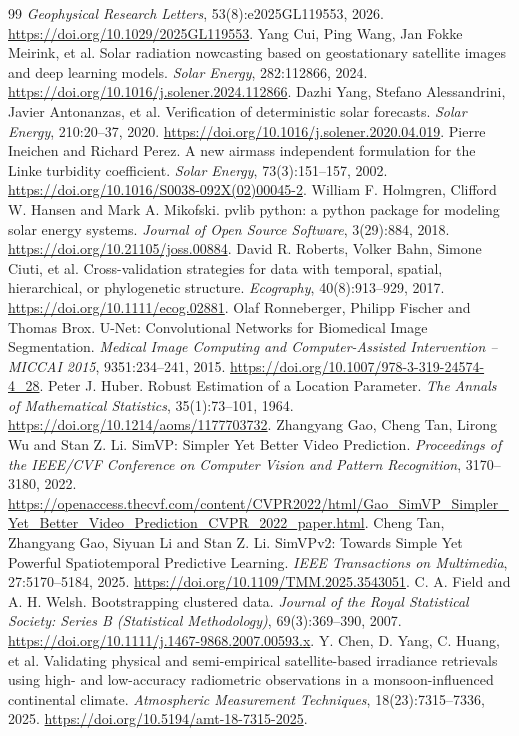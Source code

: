 \documentclass[11pt]{article}
\begin{document}
\begin{thebibliography}{99}
\textit{Geophysical Research Letters}, 53(8):e2025GL119553, 2026.
\url{https://doi.org/10.1029/2025GL119553}.
Yang Cui, Ping Wang, Jan Fokke Meirink, et al.
Solar radiation nowcasting based on geostationary satellite images and deep learning models.
\textit{Solar Energy}, 282:112866, 2024.
\url{https://doi.org/10.1016/j.solener.2024.112866}.
Dazhi Yang, Stefano Alessandrini, Javier Antonanzas, et al.
Verification of deterministic solar forecasts.
\textit{Solar Energy}, 210:20--37, 2020.
\url{https://doi.org/10.1016/j.solener.2020.04.019}.
Pierre Ineichen and Richard Perez.
A new airmass independent formulation for the Linke turbidity coefficient.
\textit{Solar Energy}, 73(3):151--157, 2002.
\url{https://doi.org/10.1016/S0038-092X(02)00045-2}.
William F. Holmgren, Clifford W. Hansen and Mark A. Mikofski.
pvlib python: a python package for modeling solar energy systems.
\textit{Journal of Open Source Software}, 3(29):884, 2018.
\url{https://doi.org/10.21105/joss.00884}.
David R. Roberts, Volker Bahn, Simone Ciuti, et al.
Cross-validation strategies for data with temporal, spatial, hierarchical, or phylogenetic structure.
\textit{Ecography}, 40(8):913--929, 2017.
\url{https://doi.org/10.1111/ecog.02881}.
Olaf Ronneberger, Philipp Fischer and Thomas Brox.
U-Net: Convolutional Networks for Biomedical Image Segmentation.
\textit{Medical Image Computing and Computer-Assisted Intervention -- MICCAI 2015}, 9351:234--241, 2015.
\url{https://doi.org/10.1007/978-3-319-24574-4_28}.
Peter J. Huber.
Robust Estimation of a Location Parameter.
\textit{The Annals of Mathematical Statistics}, 35(1):73--101, 1964.
\url{https://doi.org/10.1214/aoms/1177703732}.
Zhangyang Gao, Cheng Tan, Lirong Wu and Stan Z. Li.
SimVP: Simpler Yet Better Video Prediction.
\textit{Proceedings of the IEEE/CVF Conference on Computer Vision and Pattern Recognition}, 3170--3180, 2022.
\url{https://openaccess.thecvf.com/content/CVPR2022/html/Gao_SimVP_Simpler_Yet_Better_Video_Prediction_CVPR_2022_paper.html}.
Cheng Tan, Zhangyang Gao, Siyuan Li and Stan Z. Li.
SimVPv2: Towards Simple Yet Powerful Spatiotemporal Predictive Learning.
\textit{IEEE Transactions on Multimedia}, 27:5170--5184, 2025.
\url{https://doi.org/10.1109/TMM.2025.3543051}.
C. A. Field and A. H. Welsh.
Bootstrapping clustered data.
\textit{Journal of the Royal Statistical Society: Series B (Statistical Methodology)}, 69(3):369--390, 2007.
\url{https://doi.org/10.1111/j.1467-9868.2007.00593.x}.
Y. Chen, D. Yang, C. Huang, et al.
Validating physical and semi-empirical satellite-based irradiance retrievals using high- and low-accuracy radiometric observations in a monsoon-influenced continental climate.
\textit{Atmospheric Measurement Techniques}, 18(23):7315--7336, 2025.
\url{https://doi.org/10.5194/amt-18-7315-2025}.
\end{thebibliography}
\end{document}
